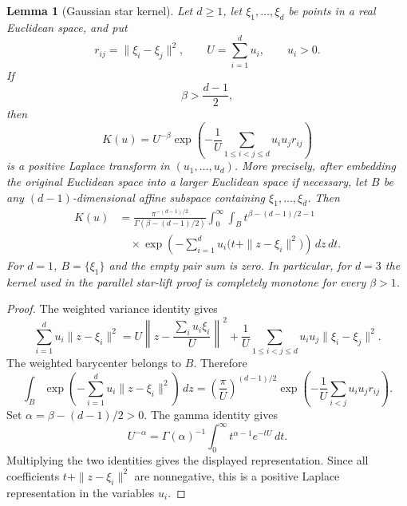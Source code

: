 \documentclass[preprint,12pt,authoryear]{elsarticle}
\numberwithin{equation}{section}
\newtheorem{lemma}[theorem]{Lemma}
\theoremstyle{definition}
\theoremstyle{remark}
\newcommand{\1}{\mathbf{1}}
\begin{document}
\begin{lemma}[Gaussian star kernel]
\label{lem:gaussian-star}
Let \(d\ge1\), let \(\xi_1,\ldots,\xi_d\) be points in a real Euclidean space, and put
\begin{equation}
        r_{ij}=\|\xi_i-\xi_j\|^2,
        \qquad
        U=\sum_{i=1}^d u_i,
        \qquad
        u_i>0.
\end{equation}
If
\begin{equation}
        \beta>\frac{d-1}{2},
\end{equation}
then
\begin{equation}
        K(u)
        =
        U^{-\beta}
        \exp\left(
        -\frac1U\sum_{1\le i<j\le d}u_i u_j r_{ij}
        \right)
\end{equation}
is a positive Laplace transform in \((u_1,\ldots,u_d)\).  More precisely, after embedding the original Euclidean space into a larger Euclidean space if necessary, let \(B\) be any \((d-1)\)-dimensional affine subspace containing \(\xi_1,\ldots,\xi_d\).  Then
\begin{equation}
\begin{aligned}
        K(u)
        &=
        \frac{\pi^{-(d-1)/2}}{\Gamma(\beta-(d-1)/2)}
        \int_0^\infty\int_B
        t^{\beta-(d-1)/2-1}  \\
        &\quad\times
        \exp\left(
        -\sum_{i=1}^d u_i\bigl(t+\|z-\xi_i\|^2\bigr)
        \right)\,dz\,dt .
\end{aligned}
\end{equation}
For \(d=1\), \(B=\{\xi_1\}\) and the empty pair sum is zero.  In particular, for \(d=3\) the kernel used in the parallel star-lift proof is completely monotone for every \(\beta>1\).
\end{lemma}

\begin{proof}
The weighted variance identity gives
\begin{equation}
        \sum_{i=1}^d u_i\|z-\xi_i\|^2
        =
        U\left\|z-\frac{\sum_i u_i\xi_i}{U}\right\|^2
        +
        \frac1U\sum_{1\le i<j\le d}u_i u_j\|\xi_i-\xi_j\|^2 .
\end{equation}
The weighted barycenter belongs to \(B\).  Therefore
\begin{equation}
        \int_B
        \exp\left(-\sum_{i=1}^d u_i\|z-\xi_i\|^2\right)\,dz
        =
        \left(\frac{\pi}{U}\right)^{(d-1)/2}
        \exp\left(
        -\frac1U\sum_{i<j}u_i u_j r_{ij}
        \right).
\end{equation}
Set \(\alpha=\beta-(d-1)/2>0\).  The gamma identity gives
\begin{equation}
        U^{-\alpha}
        =
        \Gamma(\alpha)^{-1}\int_0^\infty t^{\alpha-1}e^{-tU}\,dt .
\end{equation}
Multiplying the two identities gives the displayed representation.  Since all coefficients \(t+\|z-\xi_i\|^2\) are nonnegative, this is a positive Laplace representation in the variables \(u_i\).
\end{proof}
\end{document}
